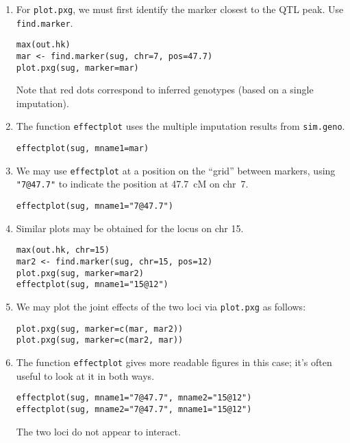 \documentclass[10pt,letterpaper]{article}
\newcommand{\usercolor}{\color [named]{BlueViolet}}
\begin{document}
\begin{enumerate}
\addtocounter{enumi}{32}
\item For \verb-plot.pxg-, we must first identify the marker closest
  to the QTL peak.  Use \verb-find.marker-.

\usercolor
\verb|max(out.hk)| \\
\verb|mar <- find.marker(sug, chr=7, pos=47.7)| \\
\verb|plot.pxg(sug, marker=mar)|
\normalcolor

Note that red dots correspond to inferred genotypes (based on a single
imputation). 


\item The function \verb-effectplot- uses the multiple imputation
  results from \verb-sim.geno-.

\usercolor
\verb|effectplot(sug, mname1=mar)|
\normalcolor

\item We may use \verb-effectplot- at a position on the ``grid''
  between markers, using \verb-"7@47.7"- to indicate the position at
  47.7~cM on chr~7.

\usercolor
\verb|effectplot(sug, mname1="7@47.7")|
\normalcolor

\item Similar plots may be obtained for the locus on chr 15.

\usercolor
\verb|max(out.hk, chr=15)| \\
\verb|mar2 <- find.marker(sug, chr=15, pos=12)| \\
\verb|plot.pxg(sug, marker=mar2)| \\
\verb|effectplot(sug, mname1="15@12")|
\normalcolor

\item We may plot the joint effects of the two loci via
  \verb-plot.pxg- as follows:

\usercolor
\verb|plot.pxg(sug, marker=c(mar, mar2))| \\
\verb|plot.pxg(sug, marker=c(mar2, mar))|
\normalcolor

\item The function \verb-effectplot- gives more readable figures in
  this case; it's often useful to look at it in both ways.

\usercolor
\verb|effectplot(sug, mname1="7@47.7", mname2="15@12")| \\
\verb|effectplot(sug, mname2="7@47.7", mname1="15@12")| 
\normalcolor

The two loci do not appear to interact.


\end{enumerate}
\end{document}
